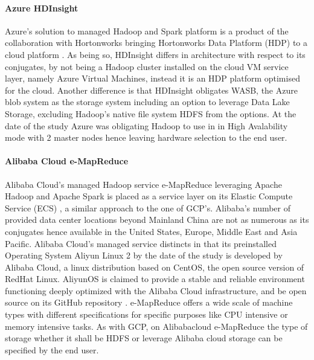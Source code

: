 \documentclass[review]{elsarticle}
\begin{document}
\paragraph{Azure HDInsight \cite{noauthor_azure_nodate}}Azure's solution to managed Hadoop and Spark platform is a product of the collaboration with Hortonworks bringing Hortonworks Data Platform (HDP) to a cloud platform \cite{noauthor_azuravail_nodate}. As being so, HDInsight differs in architecture with respect to its conjugates, by not being a Hadoop cluster installed on the cloud VM service layer, namely Azure Virtual Machines, instead it is an HDP platform optimised for the cloud. Another difference is that HDInsight obligates WASB, the Azure blob system as the storage system including an option to leverage Data Lake Storage, excluding Hadoop's native file system HDFS from the options. At the date of the study Azure was obligating Hadoop to use in in High Avalability mode with 2 master nodes hence leaving hardware selection to the end user.

\paragraph{Alibaba Cloud e-MapReduce \cite{noauthor_what_nodate}}Alibaba Cloud's managed Hadoop service e-MapReduce leveraging Apache Hadoop and Apache Spark is placed as a service layer on its Elastic Compute Service (ECS) \cite{noauthor_alielastic_nodate}, a similar approach to the one of GCP's. Alibaba's number of provided data center locations beyond Mainland China are not as numerous as its conjugates hence available in the United States, Europe, Middle East and Asia Pacific. Alibaba Cloud's managed service distincts in that its preinstalled Operating System Aliyun Linux 2 by the date of the study is developed by Alibaba Cloud, a linux distribution based on CentOS, the open source version of RedHat Linux. AliyunOS is claimed to provide a stable and reliable environment functioning deeply optimized with the Alibaba Cloud infrastructure, and be open source on its GitHub repository \cite{noauthor_alibaba_nodate}. e-MapReduce offers a wide scale of machine types with different specifications for specific purposes like CPU intensive or memory intensive tasks. As with GCP, on Alibabacloud e-MapReduce the type of storage whether it shall be HDFS or leverage Alibaba cloud storage can be specified by the end user.
\end{document}
